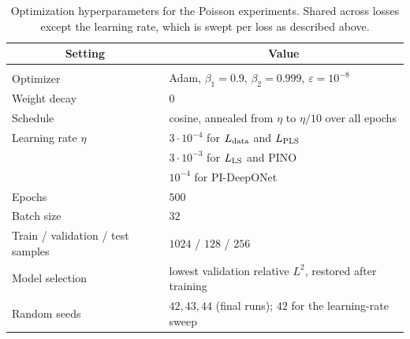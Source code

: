 \documentclass{article} %
\begin{document}
\begin{table}[htb]
   \caption{Optimization hyperparameters for the Poisson experiments. Shared across losses except
   the learning rate, which is swept per loss as described above.}
   \label{tab:optim}
   \begin{center}
   \begin{tabular}{ll}
      \multicolumn{1}{c}{\bf Setting} & \multicolumn{1}{c}{\bf Value} \\ \hline \\
      Optimizer                 & Adam, $\beta_1 = 0.9$, $\beta_2 = 0.999$, $\varepsilon = 10^{-8}$ \\
      Weight decay              & $0$ \\
      Schedule                  & cosine, annealed from $\eta$ to $\eta/10$ over all epochs \\
      Learning rate $\eta$      & $3\cdot 10^{-4}$ for $L_\textup{data}$ and $L_\textup{PLS}$ \\
                                & $3\cdot 10^{-3}$ for $L_\textup{LS}$ and PINO \\
                                & $10^{-4}$ for PI-DeepONet \\
      Epochs                    & $500$ \\
      Batch size                & $32$ \\
      Train / validation / test samples & $1024$ / $128$ / $256$ \\
      Model selection           & lowest validation relative $L^2$, restored after training \\
      Random seeds              & $42, 43, 44$ (final runs); $42$ for the learning-rate sweep \\
   \end{tabular}
   \end{center}
\end{table}
\end{document}
